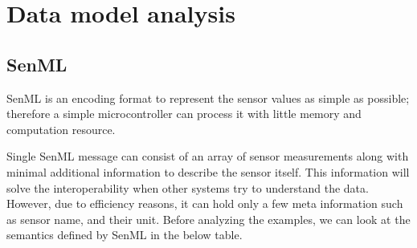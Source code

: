 

	\let\cleardoublepage\clearpage
    \chapter{Data model analysis}
    \section{SenML}
    SenML is an encoding format to represent the sensor values as simple as possible; therefore a simple microcontroller can process it with little memory and computation resource.
    
    Single SenML message can consist of an array of sensor measurements along with minimal additional information to describe the sensor itself. This information will solve the interoperability when other systems try to understand the data. However, due to efficiency reasons, it can hold only a few meta information such as sensor name, and their unit. Before analyzing the examples, we can look at the semantics defined by SenML in the below table.
    
